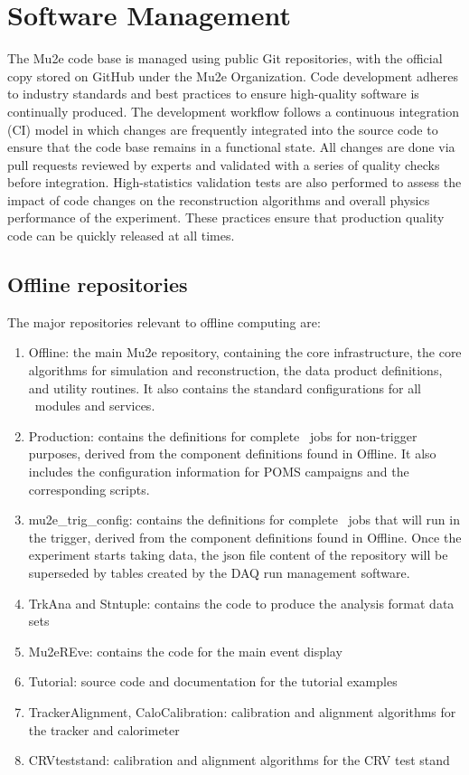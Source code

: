 \section{Software Management}
\label{sec:codemanagement}

The Mu2e code base is managed using public Git repositories, with the official copy stored on GitHub under the Mu2e Organization. %
Code development adheres to industry standards and best practices to ensure high-quality software is continually produced. The development workflow follows a continuous integration (CI) model in which changes are frequently integrated into the source code to ensure that the code base remains in a functional state. All changes are done via pull requests reviewed by experts and validated with a series of quality checks before integration. High-statistics validation tests are also performed to assess the impact of code changes on the reconstruction algorithms and overall physics performance of the experiment. These practices ensure that production quality code can be quickly released at all times. 


\subsection{Offline repositories}
The major repositories relevant to offline computing are:
\begin{enumerate}
    \item Offline: the main Mu2e repository, containing the core infrastructure, the core algorithms for simulation and reconstruction, the data product definitions, and utility routines.  It also contains the standard configurations for all \art\ modules and services.
    \item Production: contains the definitions for complete \art\ jobs for non-trigger purposes, derived from the component definitions found in Offline.  It also includes the configuration information for POMS campaigns and the corresponding scripts.
    \item mu2e\_trig\_config: contains the definitions for complete \art\ jobs that will run in the trigger, derived  from the component definitions found in Offline. Once the experiment starts taking data, the json file content of the repository will be superseded by tables created by the DAQ run management software.
    \item TrkAna and Stntuple: contains the code to produce the analysis format data sets
    \item Mu2eREve: contains the code for the main event display
    \item Tutorial: source code and documentation for the tutorial examples
    \item TrackerAlignment, CaloCalibration: calibration and alignment algorithms for the tracker and calorimeter 
    \item CRVteststand: calibration and alignment algorithms for the CRV test stand
\end{enumerate}


